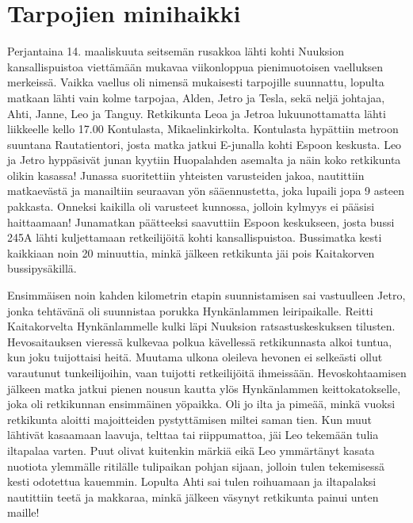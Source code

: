 \section{Tarpojien minihaikki}

\begin{multicols}{2}

\noindent Perjantaina 14. maaliskuuta seitsemän rusakkoa lähti kohti Nuuksion kansallispuistoa viettämään mukavaa viikonloppua pienimuotoisen vaelluksen merkeissä. Vaikka vaellus oli nimensä mukaisesti tarpojille suunnattu, lopulta matkaan lähti vain kolme tarpojaa, Alden, Jetro ja Tesla, sekä neljä johtajaa, Ahti, Janne, Leo ja Tanguy. Retkikunta Leoa ja Jetroa lukuunottamatta lähti liikkeelle kello 17.00 Kontulasta, Mikaelinkirkolta. Kontulasta hypättiin metroon suuntana Rautatientori, josta matka jatkui E-junalla kohti Espoon keskusta. Leo ja Jetro hyppäsivät junan kyytiin Huopalahden asemalta ja näin koko retkikunta olikin kasassa! Junassa suoritettiin yhteisten varusteiden jakoa, nautittiin matkaevästä ja manailtiin seuraavan yön sääennustetta, joka lupaili jopa 9 asteen pakkasta. Onneksi kaikilla oli varusteet kunnossa, jolloin kylmyys ei pääsisi haittaamaan! Junamatkan päätteeksi saavuttiin Espoon keskukseen, josta bussi 245A lähti kuljettamaan retkeilijöitä kohti kansallispuistoa. Bussimatka kesti kaikkiaan noin 20 minuuttia, minkä jälkeen retkikunta jäi pois Kaitakorven bussipysäkillä. 

Ensimmäisen noin kahden kilometrin etapin suunnistamisen sai vastuulleen Jetro, jonka tehtävänä oli suunnistaa porukka Hynkänlammen leiripaikalle. Reitti Kaitakorvelta Hynkänlammelle kulki läpi Nuuksion ratsastuskeskuksen tilusten. Hevosaitauksen vieressä kulkevaa polkua kävellessä retkikunnasta alkoi tuntua, kun joku tuijottaisi heitä. Muutama ulkona oleileva hevonen ei selkeästi ollut varautunut tunkeilijoihin, vaan tuijotti retkeilijöitä ihmeissään. Hevoskohtaamisen jälkeen matka jatkui pienen nousun kautta ylös Hynkänlammen keittokatokselle, joka oli retkikunnan ensimmäinen yöpaikka. Oli jo ilta ja pimeää, minkä vuoksi retkikunta aloitti majoitteiden pystyttämisen miltei saman tien. Kun muut lähtivät kasaamaan laavuja, telttaa tai riippumattoa, jäi Leo tekemään tulia iltapalaa varten. Puut olivat kuitenkin märkiä eikä Leo ymmärtänyt kasata nuotiota ylemmälle ritilälle tulipaikan pohjan sijaan, jolloin tulen tekemisessä kesti odotettua kauemmin. Lopulta Ahti sai tulen roihuamaan ja iltapalaksi nautittiin teetä ja makkaraa, minkä jälkeen väsynyt retkikunta painui unten maille!


\end{multicols}
